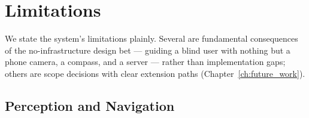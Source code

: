 \chapter{Limitations}
\label{ch:limitations}

We state the system's limitations plainly. Several are fundamental consequences of
the no-infrastructure design bet --- guiding a blind user with nothing but a phone
camera, a compass, and a server --- rather than implementation gaps; others are
scope decisions with clear extension paths (Chapter~\ref{ch:future_work}).

\section{Perception and Navigation}

